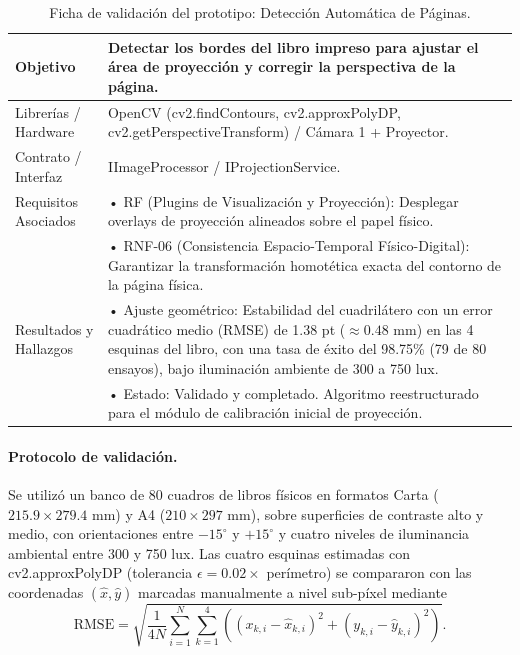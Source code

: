 \begin{table}[H]
    \centering
    \caption{Ficha de validación del prototipo: Detección Automática de Páginas.}
    \label{tab:ficha_f4}
    \begin{tabular}{L{3.2cm} L{11.0cm}}
        \toprule
        Objetivo & Detectar los bordes del libro impreso para ajustar el área de proyección y corregir la perspectiva de la página. \\ \midrule
        Librerías / Hardware & OpenCV (cv2.findContours, cv2.approxPolyDP, cv2.getPerspectiveTransform) / Cámara 1 + Proyector. \\ \midrule
        Contrato / Interfaz & IImageProcessor / IProjectionService. \\ \midrule
        Requisitos Asociados &
        • RF (Plugins de Visualización y Proyección): Desplegar overlays de proyección alineados sobre el papel físico. \vspace{0.1cm} \\
        & • RNF-06 (Consistencia Espacio-Temporal Físico-Digital): Garantizar la transformación homotética exacta del contorno de la página física. \\ \midrule
        Resultados y Hallazgos &
        • Ajuste geométrico: Estabilidad del cuadrilátero con un error cuadrático medio (RMSE) de 1.38 pt ($\approx 0.48$ mm) en las 4 esquinas del libro, con una tasa de éxito del 98.75\% (79 de 80 ensayos), bajo iluminación ambiente de 300 a 750 lux. \vspace{0.1cm} \\
        & • Estado: Validado y completado. Algoritmo reestructurado para el módulo de calibración inicial de proyección. \\ \bottomrule
    \end{tabular}
\end{table}
 
\paragraph{Protocolo de validación.} Se utilizó un banco de 80 cuadros de libros físicos en formatos Carta ($215.9 \times 279.4$ mm) y A4 ($210 \times 297$ mm), sobre superficies de contraste alto y medio, con orientaciones entre $-15^\circ$ y $+15^\circ$ y cuatro niveles de iluminancia ambiental entre 300 y 750 lux. Las cuatro esquinas estimadas con cv2.approxPolyDP (tolerancia $\epsilon = 0.02 \times$ perímetro) se compararon con las coordenadas $(\hat{x}, \hat{y})$ marcadas manualmente a nivel sub-píxel mediante
\[ \mathrm{RMSE} = \sqrt{\frac{1}{4N} \sum_{i=1}^{N} \sum_{k=1}^{4} \left( (x_{k,i} - \hat{x}_{k,i})^2 + (y_{k,i} - \hat{y}_{k,i})^2 \right)}. \]
 
